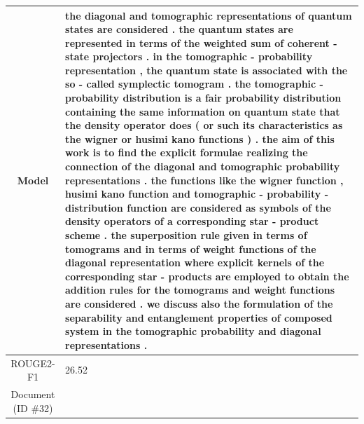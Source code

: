 \begin{table}[bth!]
\begin{tabular}{c|p{}}
\\ \hline
Model & 
the diagonal and tomographic representations of quantum states are considered . the quantum states are represented in terms of the weighted sum of coherent - state \@xmath0 projectors . in the tomographic - probability representation , the quantum state is associated with the so - called symplectic tomogram . the tomographic - probability distribution is a fair probability distribution containing the same information on quantum state that the density operator does ( or such its characteristics as the wigner or husimi kano functions ) . the aim of this work is to find the explicit formulae realizing the connection of the diagonal and tomographic probability representations . the functions like the wigner function , husimi kano function and tomographic - probability - distribution function are considered as symbols of the density operators of a corresponding star - product scheme . the superposition rule given in terms of tomograms and in terms of weight functions of the diagonal representation where explicit kernels of the corresponding star - products are employed to obtain the addition rules for the tomograms and weight functions are considered . we discuss also the formulation of the separability and entanglement properties of composed system in the tomographic probability and diagonal representations .
\\ \hline
ROUGE2-F1 & 
26.52
\\ \hline
\makecell{Document\\(ID \#32)} & 

\end{tabular}
\end{table}
